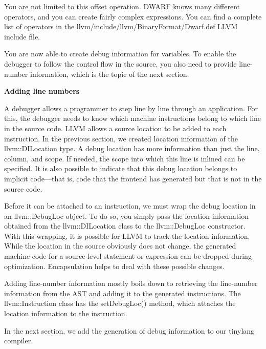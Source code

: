 You are not limited to this offset operation. DWARF knows many different operators, and you can create fairly complex expressions. You can find a complete list of operators in the llvm/include/llvm/BinaryFormat/Dwarf.def LLVM include file.\par

You are now able to create debug information for variables. To enable the debugger to follow the control flow in the source, you also need to provide line-number information, which is the topic of the next section.\par


\hspace*{\fill} \par %
\textbf{Adding line numbers}

A debugger allows a programmer to step line by line through an application. For this, the debugger needs to know which machine instructions belong to which line in the source code. LLVM allows a source location to be added to each instruction. In the previous section, we created location information of the llvm::DILocation type. A debug location has more information than just the line, column, and scope. If needed, the scope into which this line is inlined can be specified. It is also possible to indicate that this debug location belongs to implicit code—that is, code that the frontend has generated but that is not in the source code.\par

Before it can be attached to an instruction, we must wrap the debug location in an llvm::DebugLoc object. To do so, you simply pass the location information obtained from the llvm::DILocation class to the llvm::DebugLoc constructor. With this wrapping, it is possible for LLVM to track the location information. While the location in the source obviously does not change, the generated machine code for a source-level statement or expression can be dropped during optimization. Encapsulation helps to deal with these possible changes.\par

Adding line-number information mostly boils down to retrieving the line-number information from the AST and adding it to the generated instructions. The llvm::Instruction class has the setDebugLoc() method, which attaches the location information to the instruction.\par

In the next section, we add the generation of debug information to our tinylang compiler.\par

